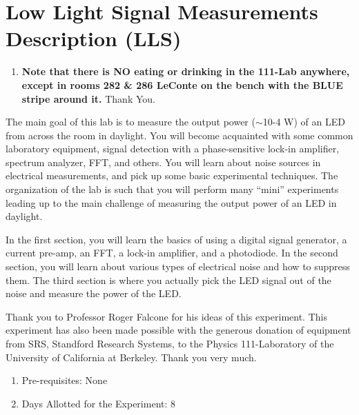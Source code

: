 \documentclass{../lab}
\begin{document}
\maketitle

\tableofcontents

\section{Low Light Signal Measurements Description (LLS)}

\begin{enumerate}
    \item \textbf{Note that there is NO eating or drinking in the 111-Lab anywhere, except in rooms 282 \& 286 LeConte on the bench with the BLUE stripe around it.} Thank You.

\end{enumerate}

The main goal of this lab is to measure the output power ($\sim$10-4 W) of an LED from across the room in daylight. You will become acquainted with some common laboratory equipment, signal detection with a phase-sensitive lock-in amplifier, spectrum analyzer, FFT, and others. You will learn about noise sources in electrical measurements, and pick up some basic experimental techniques. The organization of the lab is such that you will perform many ``mini'' experiments leading up to the main challenge of measuring the output power of an LED in daylight.

In the first section, you will learn the basics of using a digital signal generator, a current pre-amp, an FFT, a lock-in amplifier, and a photodiode. In the second section, you will learn about various types of electrical noise and how to suppress them. The third section is where you actually pick the LED signal out of the noise and measure the power of the LED.

Thank you to Professor Roger Falcone for his ideas of this experiment. This experiment has also been made possible with the generous donation of equipment from SRS, Standford Research Systems, to the Physics 111-Laboratory of the University of California at Berkeley. Thank you very much.

\begin{enumerate}
    \item Pre-requisites: None

    \item Days Allotted for the Experiment: 8

\end{enumerate}
\end{document}
